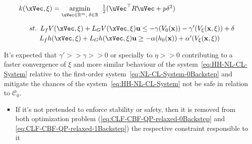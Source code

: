 \begin{equation}
    \begin{array}{l}
        k(\xVec, \mathbf{\xi}) = \underset{\uVec \in \mathbb{R}^m, \hspace{0.2em} \delta \in \mathbb{R}}{\mathrm{argmin}} \quad \hspace{-0.5em} \frac{1}{2} (\uVec^\top R \uVec + p\delta^2 ) \vspace{1em} \\ 
        \quad \hspace{0.5em}  st. \hspace{0.5em} L_fV(\xVec, \mathbf{\xi}) + L_GV(\xVec, \mathbf{\xi})\mathbf{u} \leq -\gamma(V_0(\mathbf{x})) -\gamma'(V_{\mathbf{\xi}}(\mathbf{x}, \mathbf{\xi})) + \delta \vspace{0.25em}\\
        \quad \quad \hspace{1em}                 L_fh(\xVec, \mathbf{\xi}) + L_Gh(\xVec, \mathbf{\xi})\mathbf{u} \geq -\alpha(h_0(\mathbf{x})) + \alpha'(V_{\mathbf{\xi}}(\mathbf{x}, \mathbf{\xi}))
    \end{array}
 \label{eq:CLF-CBF-QP-relaxed-1Backstep}
\end{equation}

It's expected that  \( \gamma' >> \gamma >> 0\) or specially to \(\eta >>0\) contributing to a faster convergence of \(\xi\) and more similar behaviour of the system~\eqref{eq:HH-NL-CL-System} relative to the first-order system~\eqref{eq:NL-CL-System-0Backstep} and mitigate the chances of the system~\eqref{eq:HH-NL-CL-System} not be safe in relation to \(\mathcal{C}_0\). \\

\begin{tcolorbox}[colback=blue!5!white,colframe=blue!35!white,title=Notes:]
\begin{itemize}
    \item If it's not pretended to enforce stability or safety, then it is removed from both optimization problem (\eqref{eq:CLF-CBF-QP-relaxed-0Backstep} and \eqref{eq:CLF-CBF-QP-relaxed-1Backstep}) the respective constraint responsible to it
\end{itemize}
\end{tcolorbox} 



